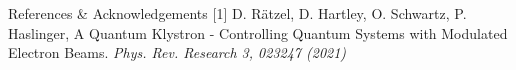 \documentclass[final]{beamer}
\begin{document}
\begin{frame}[fragile]{}
\begin{columns}[T]
\begin{column}{.49\linewidth}
%
%
      \begin{block}{\Large References \& Acknowledgements}
        [1] D. Rätzel, D. Hartley, O. Schwartz, P. Haslinger, A Quantum
        Klystron - Controlling Quantum Systems with Modulated Electron Beams.
        \textit{Phys. Rev. Research 3, 023247 (2021)}
      \end{block}


\end{column}
\end{columns}
\end{frame}
\end{document}
